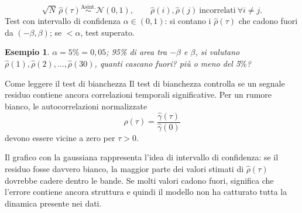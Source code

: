 \documentclass[11pt,a4paper]{article}
\newtheorem{example}{Esempio}
\begin{document}
\[
\sqrt N\,\hat\rho(\tau)\stackrel{\text{Asint.}}{\sim}\mathcal{N}(0,1),
\qquad
\hat\rho(i),\hat\rho(j)\ \text{incorrelati} \ \forall i\neq j.
\]
Test con intervallo di confidenza $\alpha\in(0,1)$: si contano i $\hat\rho(\tau)$ che cadono fuori da $(-\beta,\beta)$; se $<\alpha$, test superato.

\begin{example}
$\alpha=5\%=0{,}05$; 95\% di area tra $-\beta$ e $\beta$, si valutano $\hat\rho(1),\hat\rho(2),\dots,\hat\rho(30)$, quanti cascano fuori? più o meno del 5$\%$?
\end{example}

\begin{spiegazione}{Come leggere il test di bianchezza}
Il test di bianchezza controlla se un segnale residuo contiene ancora correlazioni temporali significative. Per un rumore bianco, le autocorrelazioni normalizzate
\[
\hat\rho(\tau)=\frac{\hat\gamma(\tau)}{\hat\gamma(0)}
\]
devono essere vicine a zero per $\tau>0$.

Il grafico con la gaussiana rappresenta l'idea di intervallo di confidenza: se il residuo fosse davvero bianco, la maggior parte dei valori stimati di $\hat\rho(\tau)$ dovrebbe cadere dentro le bande. Se molti valori cadono fuori, significa che l'errore contiene ancora struttura e quindi il modello non ha catturato tutta la dinamica presente nei dati.
\end{spiegazione}

\begin{center}
\end{center}
\end{document}
